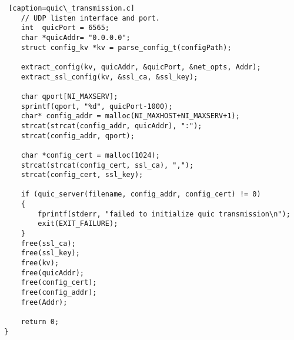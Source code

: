 \begin{lstlisting} [caption=quic\_transmission.c]
	// UDP listen interface and port.
	int  quicPort = 6565;
	char *quicAddr= "0.0.0.0";
	struct config_kv *kv = parse_config_t(configPath);
	
	extract_config(kv, quicAddr, &quicPort, &net_opts, Addr);
	extract_ssl_config(kv, &ssl_ca, &ssl_key);
	
	char qport[NI_MAXSERV];
	sprintf(qport, "%d", quicPort-1000);
	char* config_addr = malloc(NI_MAXHOST+NI_MAXSERV+1);
	strcat(strcat(config_addr, quicAddr), ":");
	strcat(config_addr, qport);
	
	char *config_cert = malloc(1024);
	strcat(strcat(config_cert, ssl_ca), ",");
	strcat(config_cert, ssl_key);
	
	if (quic_server(filename, config_addr, config_cert) != 0)
	{
		fprintf(stderr, "failed to initialize quic transmission\n");
		exit(EXIT_FAILURE);
	}
	free(ssl_ca);
	free(ssl_key);
	free(kv);
	free(quicAddr);
	free(config_cert);
	free(config_addr);
	free(Addr);
	
	return 0;
}
\end{lstlisting}

